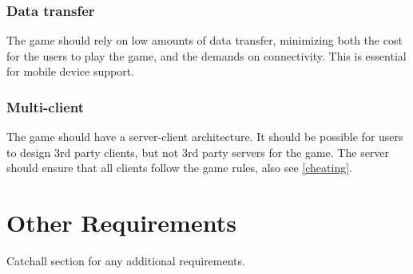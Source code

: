 \documentclass[a4paper,10pt]{article}
\begin{document}
\subsubsection{Data transfer}
The game should rely on low amounts of data transfer, minimizing both the cost for the users to play the game, and the demands on connectivity. This is essential for mobile device support.

\subsubsection{Multi-client}
The game should have a server-client architecture. It should be possible for users to design 3rd party clients, but not 3rd party servers for the game. The server should ensure that all clients follow the game rules, also see \ref{cheating}.

\section{Other Requirements}
Catchall section for any additional requirements.
\end{document}
